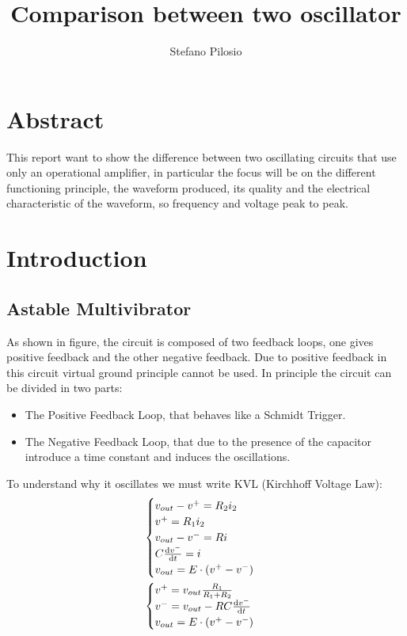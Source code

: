 \documentclass[a4paper, twocolumn]{article}
\begin{document}
\title{Comparison between two oscillator}
\author{Stefano Pilosio}

\maketitle

\section{Abstract}

This report want to show the difference between two oscillating circuits that use only an operational amplifier, in particular the focus will be on the different functioning principle, the waveform produced, its quality and the electrical characteristic of the waveform, so frequency and voltage peak to peak.

\section{Introduction}

\subsection{Astable Multivibrator}


\begin{center}
    \centering
    \def \svgwidth{\columnwidth}
    
\end{center}

As shown in figure, the circuit is composed of two feedback loops, one gives positive feedback and the other negative feedback. Due to positive feedback in this circuit virtual ground principle cannot be used. In principle the circuit can be divided in two parts:

\begin{itemize}
    \item The Positive Feedback Loop, that behaves like a Schmidt Trigger.
    \item The Negative Feedback Loop, that due to the presence of the capacitor introduce a time constant and induces the oscillations.
\end{itemize}

To understand why it oscillates we must write KVL (Kirchhoff Voltage Law):
\begin{gather}
    \begin{cases}
        v_{out} - v^+ = R_2i_2\\
        v^+= R_1i_2\\
        v_{out}-v^- = R i\\
        C\dv{v^-}{t}= i\\
        v_{out} = E \cdot (v^+-v^-)
    \end{cases}\\
    \begin{cases}
        \label{eq:genStable}
        v^+=v_{out}\frac{R_1}{R_1+R_2}\\
        v^-=v_{out}-RC\dv{v^-}{t}\\
        v_{out} = E \cdot (v^+-v^-)
    \end{cases}
\end{gather}
\end{document}
